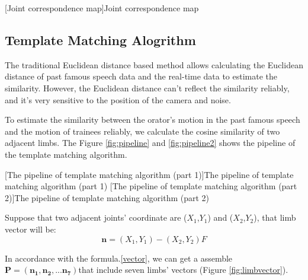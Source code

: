 [Joint correspondence map]{Joint correspondence map}

\subsection*{Template Matching Alogrithm}
\par The traditional Euclidean distance based method allows calculating the Euclidean distance of past famous speech data and the real-time data to estimate the similarity. However, the Euclidean distance can't reflect the similarity reliably, and it's very sensitive to the position of the camera and noise. 
\par To estimate the similarity between the orator's motion in the past famous speech and the motion of trainees reliably, we calculate the cosine similarity of two adjacent limbs. The Figure \ref{fig:pipeline} and \ref{fig:pipeline2} shows the pipeline of the template matching algorithm. 

[The pipeline of template matching algorithm (part 1)]{The pipeline of template matching algorithm (part 1)}
[The pipeline of template matching algorithm (part 2)]{The pipeline of template matching algorithm (part 2)}

\par Suppose that two adjacent joints' coordinate are ($X_{1}$,$Y_{1}$) and ($X_{2}$,$Y_{2}$), that limb vector will be:
\begin{equation}
    \bm {n}= \left (X_{1} , Y_{1}\right )-\left (X_{2} , Y_{2}\right )F
\label{vector}
\end{equation}
    
\par In accordance with the formula.\ref{vector}, we can get a assemble $\bm {P = (n_{1},n_{2},...n_{7})}$that include seven limbs' vectors (Figure \ref{fig:limbvector}).

